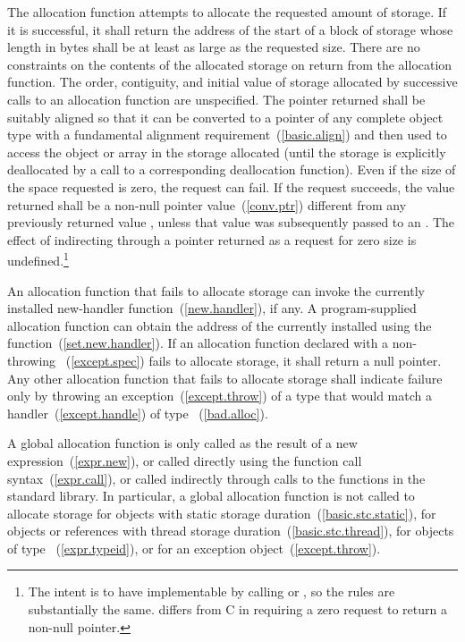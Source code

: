 \pnum
The allocation function attempts to allocate the requested amount of
storage. If it is successful, it shall return the address of the start
of a block of storage whose length in bytes shall be at least as large
as the requested size. There are no constraints on the contents of the
allocated storage on return from the allocation function. The order,
contiguity, and initial value of storage allocated by successive calls
to an allocation function are unspecified. The pointer returned shall be
suitably aligned so that it can be converted to a pointer of any
complete object type with a fundamental alignment requirement~(\ref{basic.align})
and then used to access the object or array in the
storage allocated (until the storage is explicitly deallocated by a call
to a corresponding deallocation function). Even if the size of the space
requested is zero, the request can fail. If the request succeeds, the
value returned shall be a non-null pointer value~(\ref{conv.ptr})
 different from any previously returned value ,
unless that value  was subsequently passed to an
 . The effect of indirecting through a pointer
returned as a request for zero size is undefined.\footnote{The intent is
to have  implementable by
calling  or , so the rules are
substantially the same. \Cpp differs from C in requiring a zero request
to return a non-null pointer.}

\pnum
An allocation function that fails to allocate storage can invoke the
currently installed new-handler function~(\ref{new.handler}), if any.
\enternote
{}%
A program-supplied allocation function can obtain the address of the
currently installed  using the
 function~(\ref{set.new.handler}). \exitnote
If an allocation function declared with a non-throwing
~(\ref{except.spec})
fails to allocate storage, it shall return a null pointer. Any other
allocation function that fails to allocate storage shall indicate
failure only by throwing an exception~(\ref{except.throw}) of a type
that would match a handler~(\ref{except.handle}) of type
~(\ref{bad.alloc}).

\pnum
A global allocation function is only called as the result of a new
expression~(\ref{expr.new}), or called directly using the function call
syntax~(\ref{expr.call}), or called indirectly through calls to the
functions in the \Cpp standard library. \enternote In particular, a
global allocation function is not called to allocate storage for objects
with static storage duration~(\ref{basic.stc.static}), for objects or references
with thread storage duration~(\ref{basic.stc.thread}), for objects of
type ~(\ref{expr.typeid}), or for an
exception object~(\ref{except.throw}).
\exitnote

